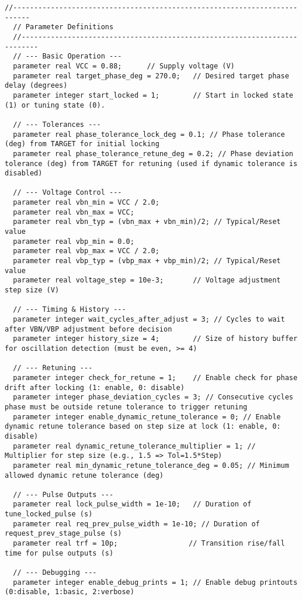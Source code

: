 \begin{lstlisting}[caption={Verilog-A Generic Vb Tuner Implementation}]
  //--------------------------------------------------------------------------
  // Parameter Definitions
  //--------------------------------------------------------------------------
  // --- Basic Operation ---
  parameter real VCC = 0.88;      // Supply voltage (V)
  parameter real target_phase_deg = 270.0;   // Desired target phase delay (degrees)
  parameter integer start_locked = 1;        // Start in locked state (1) or tuning state (0).

  // --- Tolerances ---
  parameter real phase_tolerance_lock_deg = 0.1; // Phase tolerance (deg) from TARGET for initial locking
  parameter real phase_tolerance_retune_deg = 0.2; // Phase deviation tolerance (deg) from TARGET for retuning (used if dynamic tolerance is disabled)

  // --- Voltage Control ---
  parameter real vbn_min = VCC / 2.0;
  parameter real vbn_max = VCC;
  parameter real vbn_typ = (vbn_max + vbn_min)/2; // Typical/Reset value
  parameter real vbp_min = 0.0;
  parameter real vbp_max = VCC / 2.0;
  parameter real vbp_typ = (vbp_max + vbp_min)/2; // Typical/Reset value
  parameter real voltage_step = 10e-3;       // Voltage adjustment step size (V)

  // --- Timing & History ---
  parameter integer wait_cycles_after_adjust = 3; // Cycles to wait after VBN/VBP adjustment before decision
  parameter integer history_size = 4;        // Size of history buffer for oscillation detection (must be even, >= 4)

  // --- Retuning ---
  parameter integer check_for_retune = 1;    // Enable check for phase drift after locking (1: enable, 0: disable)
  parameter integer phase_deviation_cycles = 3; // Consecutive cycles phase must be outside retune tolerance to trigger retuning
  parameter integer enable_dynamic_retune_tolerance = 0; // Enable dynamic retune tolerance based on step size at lock (1: enable, 0: disable)
  parameter real dynamic_retune_tolerance_multiplier = 1; // Multiplier for step size (e.g., 1.5 => Tol=1.5*Step)
  parameter real min_dynamic_retune_tolerance_deg = 0.05; // Minimum allowed dynamic retune tolerance (deg)

  // --- Pulse Outputs ---
  parameter real lock_pulse_width = 1e-10;   // Duration of tune_locked_pulse (s)
  parameter real req_prev_pulse_width = 1e-10; // Duration of request_prev_stage_pulse (s)
  parameter real trf = 10p;                 // Transition rise/fall time for pulse outputs (s)

  // --- Debugging ---
  parameter integer enable_debug_prints = 1; // Enable debug printouts (0:disable, 1:basic, 2:verbose)


\end{lstlisting}
